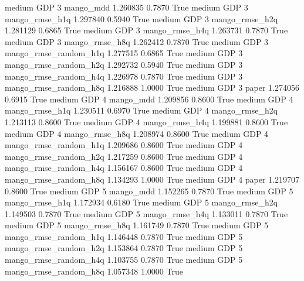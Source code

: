     medium      GDP                 3             mango_mdd   1.260835      0.7870    True
    medium      GDP                 3        mango_rmse_h1q   1.297840      0.5940    True
    medium      GDP                 3        mango_rmse_h2q   1.281129      0.6865    True
    medium      GDP                 3        mango_rmse_h4q   1.263731      0.7870    True
    medium      GDP                 3        mango_rmse_h8q   1.262412      0.7870    True
    medium      GDP                 3 mango_rmse_random_h1q   1.277515      0.6865    True
    medium      GDP                 3 mango_rmse_random_h2q   1.292732      0.5940    True
    medium      GDP                 3 mango_rmse_random_h4q   1.226978      0.7870    True
    medium      GDP                 3 mango_rmse_random_h8q   1.216888      1.0000    True
    medium      GDP                 3                 paper   1.274056      0.6915    True
    medium      GDP                 4             mango_mdd   1.209856      0.8600    True
    medium      GDP                 4        mango_rmse_h1q   1.230511      0.6970    True
    medium      GDP                 4        mango_rmse_h2q   1.213113      0.8600    True
    medium      GDP                 4        mango_rmse_h4q   1.199881      0.8600    True
    medium      GDP                 4        mango_rmse_h8q   1.208974      0.8600    True
    medium      GDP                 4 mango_rmse_random_h1q   1.209686      0.8600    True
    medium      GDP                 4 mango_rmse_random_h2q   1.217259      0.8600    True
    medium      GDP                 4 mango_rmse_random_h4q   1.156167      0.8600    True
    medium      GDP                 4 mango_rmse_random_h8q   1.134293      1.0000    True
    medium      GDP                 4                 paper   1.219707      0.8600    True
    medium      GDP                 5             mango_mdd   1.152265      0.7870    True
    medium      GDP                 5        mango_rmse_h1q   1.172934      0.6180    True
    medium      GDP                 5        mango_rmse_h2q   1.149503      0.7870    True
    medium      GDP                 5        mango_rmse_h4q   1.133011      0.7870    True
    medium      GDP                 5        mango_rmse_h8q   1.161749      0.7870    True
    medium      GDP                 5 mango_rmse_random_h1q   1.146448      0.7870    True
    medium      GDP                 5 mango_rmse_random_h2q   1.153864      0.7870    True
    medium      GDP                 5 mango_rmse_random_h4q   1.103755      0.7870    True
    medium      GDP                 5 mango_rmse_random_h8q   1.057348      1.0000    True
